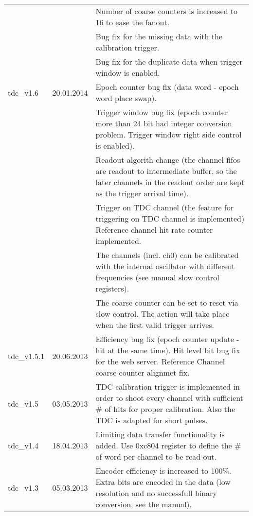 \documentclass[11pt]{article}
\begin{document}
\begin{center}
\begin{longtable}{|l|l|p{10cm}|}
                   &                         &  Number of coarse counters is increased to 16 to ease the fanout.                  \\
                   &                         &  Bug fix for the missing data with the calibration trigger.                        \\
                   &                         &  Bug fix for the duplicate data when trigger window is enabled.                    \\
\hline
 tdc\_v1.6         &             20.01.2014  &  Epoch counter bug fix (data word - epoch word place swap).                        \\
                   &                         &  Trigger window bug fix (epoch counter more than 24 bit had integer conversion problem. Trigger window right side control is enabled).  \\
                   &                         &  Readout algorith change (the channel fifos are readout to intermediate buffer, so the later channels in the readout order are kept as the trigger arrival time).  \\
                   &                         &  Trigger on TDC channel (the feature for triggering on TDC channel is implemented) Reference channel hit rate counter implemented.  \\
                   &                         &  The channels (incl. ch0) can be calibrated with the internal oscillator with different frequencies (see manual slow control registers).  \\
                   &                         &  The coarse counter can be set to reset via slow control. The action will take place when the first valid trigger arrives.  \\
\hline
 tdc\_v1.5.1       &             20.06.2013  &  Efficiency bug fix (epoch counter update - hit at the same time). Hit level bit bug fix for the web server. Reference Channel coarse counter alignmet fix.  \\
\hline
 tdc\_v1.5         &             03.05.2013  &  TDC calibration trigger is implemented in order to shoot every channel with sufficient \# of hits for proper calibration. Also the TDC is adapted for short pulses.  \\
\hline
 tdc\_v1.4         &             18.04.2013  &  Limiting data transfer functionality is added. Use 0xc804 register to define the \# of word per channel to be read-out.  \\
\hline
 tdc\_v1.3         &             05.03.2013  &  Encoder efficiency is increased to 100\%. Extra bits are encoded in the data (low resolution and no successfull binary conversion, see the manual).  \\

\end{longtable}
\end{center}
\end{document}
